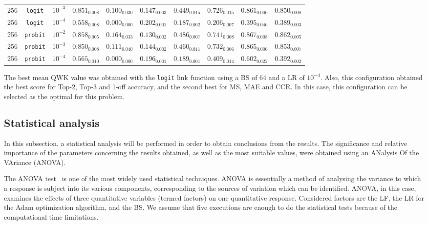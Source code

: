 \documentclass[preprint]{elsarticle}
\begin{document}
\begin{table}[!t]
{\begin{tabular}{c@{\hskip 0.15cm}c@{\hskip 0.15cm}c@{\hskip 0.15cm}c@{\hskip 0.15cm}c@{\hskip 0.15cm}c@{\hskip 0.15cm}c@{\hskip 0.15cm}c@{\hskip 0.15cm}c@{\hskip 0.15cm}c}
		256 & \texttt{logit} & $10^{-3}$ & $0.851_{0.008}$ & $0.100_{0.030}$ & $0.147_{0.003}$ & $0.449_{0.015}$ & $0.726_{0.015}$ & $0.861_{0.006}$ & $0.850_{0.008}$\\
		256 & \texttt{logit} & $10^{-4}$ & $0.558_{0.008}$ & $0.000_{0.000}$ & $0.202_{0.001}$ & $0.187_{0.002}$ & $0.206_{0.007}$ & $0.395_{0.046}$ & $0.389_{0.003}$\\
		256 & \texttt{probit} & $10^{-2}$ & $0.858_{0.005}$ & $0.164_{0.033}$ & $0.130_{0.002}$ & $0.486_{0.007}$ & $0.741_{0.008}$ & $0.867_{0.008}$ & $0.862_{0.005}$\\
		256 & \texttt{probit} & $10^{-3}$ & $0.850_{0.008}$ & $0.111_{0.040}$ & $0.144_{0.002}$ & $0.460_{0.011}$ & $0.732_{0.006}$ & $0.865_{0.006}$ & $0.853_{0.007}$\\
		256 & \texttt{probit} & $10^{-4}$ & $0.565_{0.010}$ & $0.000_{0.000}$ & $0.196_{0.001}$ & $0.189_{0.001}$ & $0.409_{0.014}$ & $0.602_{0.022}$ & $0.392_{0.002}$\\
		\hline
		\hline
	\end{tabular}}
\end{table}

The best mean QWK value was obtained with the \texttt{logit} link function using a BS of 64 and a LR of $10^{-4}$. Also, this configuration obtained the best score for Top-2, Top-3 and 1-off accuracy, and the second best for MS, MAE and CCR. In this case, this configuration can be selected as the optimal for this problem.

\subsection{Statistical analysis}
\label{sect:statisticalanalysis}
In this subsection, a statistical analysis will be performed in order to obtain conclusions from the results. The significance and relative importance of the parameters concerning the results obtained, as well as the most suitable values, were obtained using an ANalysis Of the VAriance (ANOVA).

The ANOVA test~\cite{miller1997beyond} is one of the most widely used statistical techniques. ANOVA is essentially a method of analysing the variance to which a response is subject into its various components, corresponding to the sources of variation which can be identified. ANOVA, in this case, examines the effects of three quantitative variables (termed factors) on one quantitative response. Considered factors are the LF, the LR for the Adam optimization algorithm, and the BS. We assume that five executions are enough to do the statistical tests because of the computational time limitations.
\end{document}
